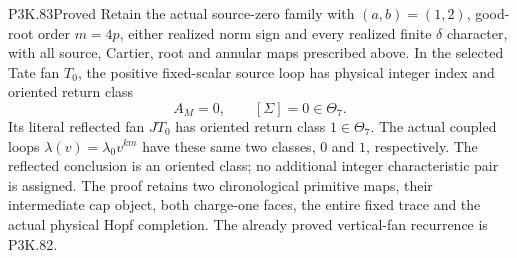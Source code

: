 \begin{statement}{P3K.83}{Proved}
Retain the actual source-zero family with
\((a,b)=(1,2)\), good-root order \(m=4p\), either realized norm
sign and every realized finite \(\delta\) character, with all source,
Cartier, root and annular maps prescribed above. In the selected
Tate fan \(T_0\), the positive fixed-scalar source loop has physical
integer index and oriented return class
\[
                         A_M=0,\qquad [\Sigma]=0\in\Theta_7.
\]
Its literal reflected fan \(JT_0\) has oriented return class
\(1\in\Theta_7\). The actual coupled loops
\(\lambda(v)=\lambda_0v^{km}\) have these same two classes,
\(0\) and \(1\), respectively. The reflected conclusion is an
oriented class; no additional integer characteristic pair is
assigned. The proof retains two chronological primitive maps,
their intermediate cap object, both charge-one faces, the entire
fixed trace and the actual physical Hopf completion. The already
proved vertical-fan recurrence is P3K.82.
\end{statement}
